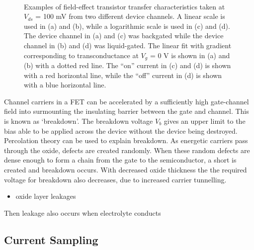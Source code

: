 \documentclass[
  a4paper,
]{scrbook}
\providecommand{\tightlist}{%
  \setlength{\itemsep}{0pt}\setlength{\parskip}{0pt}}\usepackage{longtable,booktabs,array}
\begin{document}
\begin{figure}
\begin{minipage}[t]{0.45\linewidth}
{{}

}

\end{minipage}%
%
\begin{minipage}[t]{0.01\linewidth}

{\centering 

~

}

\end{minipage}%

\caption{\label{fig-gating-transfer}Examples of field-effect transistor
transfer characteristics taken at \(V_{ds}\) = 100 mV from two different
device channels. A linear scale is used in (a) and (b), while a
logarithmic scale is used in (c) and (d). The device channel in (a) and
(c) was backgated while the device channel in (b) and (d) was
liquid-gated. The linear fit with gradient corresponding to
transconductance at \(V_g\) = 0 V is shown in (a) and (b) with a dotted
red line. The ``on'' current in (c) and (d) is shown with a red
horizontal line, while the ``off'' current in (d) is shown with a blue
horizontal line.}

\end{figure}

Channel carriers in a FET can be accelerated by a sufficiently high
gate-channel field into surmounting the insulating barrier between the
gate and channel. This is known as `breakdown'. The breakdown voltage
\(V_b\) gives an upper limit to the bias able to be applied across the
device without the device being destroyed. Percolation theory can be
used to explain breakdown. As energetic carriers pass through the oxide,
defects are created randomly. When these random defects are dense enough
to form a chain from the gate to the semiconductor, a short is created
and breakdown occurs. With decreased oxide thickness the the required
voltage for breakdown also decreases, due to increased carrier
tunnelling.

\begin{itemize}
\tightlist
\item
  oxide layer leakages
\end{itemize}

Then leakage also occurs when electrolyte conducts

\hypertarget{current-sampling}{%
\subsection{Current Sampling}\label{current-sampling}}
\end{document}

